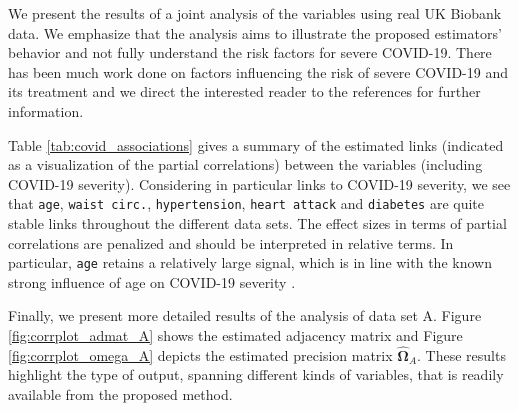 We present the results of a joint analysis of the variables using real UK Biobank data. We emphasize that the analysis aims to illustrate the proposed estimators' behavior and not fully understand the risk factors for severe COVID-19. There has been much work done on factors influencing the risk of severe COVID-19 and its treatment
\citep[see, among others,][]{williamson2020,berlin2020} and we direct the interested reader to the references for further information.

Table \ref{tab:covid_associations} gives a summary of the estimated links (indicated as a visualization of the partial correlations) between the variables (including COVID-19 severity). Considering in particular links to COVID-19 severity, we see that \texttt{age}, \texttt{waist circ.}, \texttt{hypertension}, \texttt{heart attack} and \texttt{diabetes} are quite stable links throughout the different data sets. The effect sizes in terms of partial correlations are penalized and should be interpreted in relative terms. In particular, \texttt{age} retains a relatively large signal, which is in line with the known strong influence of age on COVID-19 severity \citep[see, e.g.][]{williamson2020}.

Finally, we present more detailed results of the analysis of data set A. Figure \ref{fig:corrplot_admat_A} shows the estimated adjacency matrix and Figure \ref{fig:corrplot_omega_A} depicts the estimated precision matrix $\hat{\boldsymbol\Omega}_{A}$. These results highlight the type of output, spanning different kinds of variables, that is readily available from the proposed method.